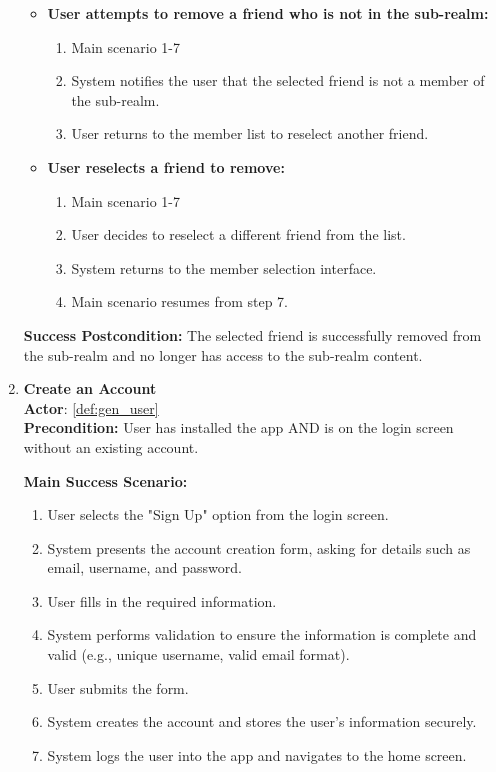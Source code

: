 \documentclass{article}
\begin{document}
\begin{enumerate}[label=\textbf{UC\arabic*}]
\begin{itemize}
              \item[{}] \textbf{User attempts to remove a friend who is not in the sub-realm:}
                    \begin{enumerate}[label=\textbf{\arabic*.}]
                        \item Main scenario 1-7
                        \item System notifies the user that the selected friend is not a member of the sub-realm.
                        \item User returns to the member list to reselect another friend.
                    \end{enumerate}

              \item[{}] \textbf{User reselects a friend to remove:}
                    \begin{enumerate}[label=\textbf{\arabic*.}]
                        \item Main scenario 1-7
                        \item User decides to reselect a different friend from the list.
                        \item System returns to the member selection interface.
                        \item Main scenario resumes from step 7.
                    \end{enumerate}
          \end{itemize}

          \textbf{Success Postcondition:} The selected friend is successfully removed from the sub-realm and no longer has access to the sub-realm content.

    \item \label{uc:23} \textbf{Create an Account} \\
          \textbf{Actor}: \ref{def:gen_user} \\
          \textbf{Precondition:} User has installed the app AND is on the login screen without an existing account.

          \textbf{Main Success Scenario:}
          \begin{enumerate}[label=\textbf{\arabic*.}]
              \item User selects the "Sign Up" option from the login screen.
              \item System presents the account creation form, asking for details such as email, username, and password.
              \item User fills in the required information.
              \item System performs validation to ensure the information is complete and valid (e.g., unique username, valid email format).
              \item User submits the form.
              \item System creates the account and stores the user’s information securely.
              \item System logs the user into the app and navigates to the home screen.
          \end{enumerate}


\end{enumerate}
\end{document}
